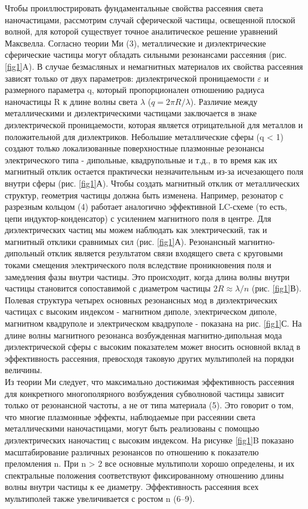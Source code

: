 Чтобы проиллюстрировать фундаментальные свойства рассеяния света наночастицами, рассмотрим случай сферической частицы, освещенной плоской волной, для которой существует точное аналитическое решение уравнений Максвелла. Согласно теории Ми (3), металлические и диэлектрические сферические частицы могут обладать сильными резонансами рассеяния (рис. \ref{fig1}A). В случае безмасляных и немагнитных материалов их свойства рассеяния зависят только от двух параметров: диэлектрической проницаемости $\varepsilon$  и размерного параметра q, который пропорционален отношению радиуса наночастицы R к длине волны света $\lambda$ ($q = 2\pi R/\lambda$). Различие между металлическими и диэлектрическими частицами заключается в знаке диэлектрической проницаемости, которая является отрицательной для металлов и положительной для диэлектриков. Небольшие металлические сферы (q < 1) создают только локализованные поверхностные плазмонные резонансы электрического типа - дипольные, квадрупольные и т.д., в то время как их магнитный отклик остается практически незначительным из-за исчезающего поля внутри сферы (рис. \ref{fig1}А).  Чтобы создать магнитный отклик от металлических структур, геометрия частицы должна быть изменена. Например, резонатор с разрезным кольцом (4) работает аналогично эффективной LC-схеме (то есть, цепи индуктор-конденсатор) с усилением магнитного поля в центре. Для диэлектрических частиц мы можем наблюдать как электрический, так и магнитный отклики сравнимых сил (рис. \ref{fig1}А). Резонансный магнитно-дипольный отклик является результатом связи входящего света с круговыми токами смещения электрического поля вследствие проникновения поля и замедления фазы внутри частицы. Это происходит, когда длина волны внутри частицы становится сопоставимой с диаметром частицы $2R \approx \lambda/n$ (рис. \ref{fig1}В). Полевая структура четырех основных резонансных мод в диэлектрических частицах с высоким индексом - магнитном диполе, электрическом диполе, магнитном квадруполе и электрическом квадруполе - показана на рис. \ref{fig1}С. На длине волны магнитного резонанса возбужденная магнитно-дипольная мода диэлектрической сферы с высоким показателем может вносить основной вклад в эффективность рассеяния, превосходя таковую других мультиполей на порядки величины.
\\
\hspace*{2mm}
Из теории Ми следует, что максимально достижимая эффективность рассеяния для конкретного многополярного возбуждения субволновой частицы зависит только от резонансной частоты, а не от типа материала (5). Это говорит о том, что многие плазмонные эффекты, наблюдаемые при рассеянии света металлическими наночастицами, могут быть реализованы с помощью диэлектрических наночастиц с высоким индексом. На рисунке \ref{fig1}B показано масштабирование различных резонансов по отношению к показателю преломления n. При n > 2 все основные мультиполи хорошо определены, и их спектральные положения соответствуют фиксированному отношению длины волны внутри частицы к ее диаметру. Эффективность рассеяния всех мультиполей также увеличивается с ростом n (6–9).
